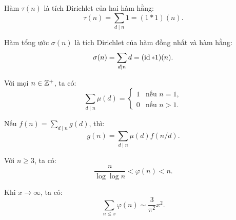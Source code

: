 \documentclass[../imo-training-open-book.tex]{subfiles}
\begin{document}
\vspace{1em}

\begin{theorem}[Đẳng thức \( \tau = 1 * 1 \)]
    \label{theorem:tau-convolution}
    Hàm \( \tau(n) \) là tích Dirichlet của hai hàm hằng:
    \[
        \tau(n) = \sum_{d \mid n} 1 = (1 * 1)(n).
    \]
\end{theorem}

\vspace{1em}

\begin{theorem}[Đẳng thức \( \sigma = \id * 1 \)]
    \label{theorem:sigma-convolution}
    Hàm tổng ước \( \sigma(n) \) là tích Dirichlet của hàm đồng nhất và hàm hằng:
    \[
        \sigma(n) = \sum_{d \mid n} d = (\operatorname{id} * 1)(n).
    \]
\end{theorem}

\vspace{1em}

\begin{theorem}
    \label{theorem:sum-mu-divisors}
    Với mọi \( n \in \mathbb Z^+ \), ta có:
    \[
        \sum_{d \mid n} \mu(d) =
        \begin{cases}
            1 & \text{nếu } n = 1, \\
            0 & \text{nếu } n > 1.
        \end{cases}
    \]
\end{theorem}

\vspace{1em}

\begin{theorem}
    \label{theorem:mobius-inversion-arithmetic}
    Nếu \( f(n) = \sum_{d \mid n} g(d) \), thì:
    \[
        g(n) = \sum_{d \mid n} \mu(d) f(n/d).
    \]
\end{theorem}

\vspace{1em}

\begin{theorem}
    \label{theorem:totient-bound}
    Với \( n \ge 3 \), ta có:
    \[
        \frac{n}{\log \log n} < \varphi(n) < n.
    \]
\end{theorem}

\vspace{1em}

\begin{theorem}
    \label{theorem:totient-sum-asymptotic}
    Khi \( x \to \infty \), ta có:
    \[
        \sum_{n \le x} \varphi(n) \sim \frac{3}{\pi^2} x^2.
    \]
\end{theorem}
\end{document}
